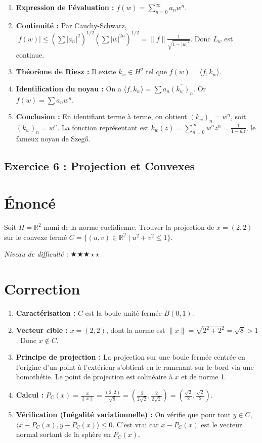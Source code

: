 \documentclass[11pt,a4paper]{article}
\begin{document}
\begin{enumerate}
\item \textbf{Expression de l'évaluation :} $f(w) = \sum_{n=0}^\infty a_n w^n$.
\item \textbf{Continuité :} Par Cauchy-Schwarz, $|f(w)| \le (\sum |a_n|^2)^{1/2} (\sum |w|^{2n})^{1/2} = \|f\| \frac{1}{\sqrt{1-|w|^2}}$. Donc $L_w$ est continue.
\item \textbf{Théorème de Riesz :} Il existe $k_w \in H^2$ tel que $f(w) = \langle f, k_w \rangle$.
\item \textbf{Identification du noyau :} On a $\langle f, k_w \rangle = \sum a_n \overline{(k_w)_n}$. Or $f(w) = \sum a_n w^n$.
\item \textbf{Conclusion :} En identifiant terme à terme, on obtient $\overline{(k_w)_n} = w^n$, soit $(k_w)_n = \overline{w}^n$. La fonction représentant est $k_w(z) = \sum_{n=0}^\infty \overline{w}^n z^n = \frac{1}{1 - \overline{w}z}$, le fameux noyau de Szegő.
\end{enumerate}


\subsection*{Exercice 6 : Projection et Convexes}

\section{Énoncé}

Soit $H = \mathbb{R}^2$ muni de la norme euclidienne. Trouver la projection de $x = (2, 2)$ sur le convexe fermé $C = \{ (u, v) \in \mathbb{R}^2 \mid u^2 + v^2 \le 1 \}$.

\textit{Niveau de difficulté :} $\bigstar\bigstar\bigstar\star\star$

\section{Correction}

\begin{enumerate}
\item \textbf{Caractérisation :} $C$ est la boule unité fermée $B(0, 1)$.
\item \textbf{Vecteur cible :} $x = (2, 2)$, dont la norme est $\|x\| = \sqrt{2^2+2^2} = \sqrt{8} > 1$. Donc $x \notin C$.
\item \textbf{Principe de projection :} La projection sur une boule fermée centrée en l'origine d'un point à l'extérieur s'obtient en le ramenant sur le bord via une homothétie. Le point de projection est colinéaire à $x$ et de norme 1.
\item \textbf{Calcul :} $P_C(x) = \frac{x}{\|x\|} = \frac{(2, 2)}{\sqrt{8}} = (\frac{2}{2\sqrt{2}}, \frac{2}{2\sqrt{2}}) = (\frac{\sqrt{2}}{2}, \frac{\sqrt{2}}{2})$.
\item \textbf{Vérification (Inégalité variationnelle) :} On vérifie que pour tout $y \in C$, $\langle x - P_C(x), y - P_C(x) \rangle \le 0$. C'est vrai car $x - P_C(x)$ est le vecteur normal sortant de la sphère en $P_C(x)$.
\end{enumerate}
\end{document}
